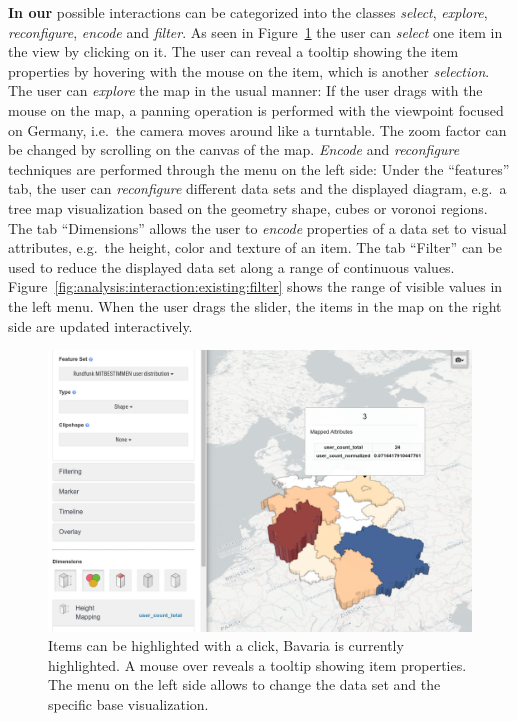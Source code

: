 \textbf{In our \visan{}} possible interactions can be categorized into the classes \emph{select}, \emph{explore}, \emph{reconfigure}, \emph{encode} and \emph{filter}.
As seen in Figure~\ref{fig:analysis:interaction:existing} the user can \emph{select} one item in the view by clicking on it.
The user can reveal a tooltip showing the item properties by hovering with the mouse on the item, which is another \emph{selection}.
The user can \emph{explore} the map in the usual manner:
If the user drags with the mouse on the map, a panning operation is performed with the viewpoint focused on Germany, i.e.\ the camera moves around like a turntable.
The zoom factor can be changed by scrolling on the canvas of the map.
\emph{Encode} and \emph{reconfigure} techniques are performed through the menu on the left side:
Under the ``features'' tab, the user can \emph{reconfigure} different data sets and the displayed diagram, e.g.\ a tree map visualization based on the geometry shape, cubes or voronoi regions.
The tab ``Dimensions'' allows the user to \emph{encode} properties of a data set to visual attributes, e.g.\ the height, color and texture of an item.
The tab ``Filter'' can be used to reduce the displayed data set along a range of continuous values.
Figure~\ref{fig:analysis:interaction:existing:filter} shows the range of visible values in the left menu.
When the user drags the slider, the items in the map on the right side are updated interactively.

\begin{figure}[h]
  \centering
  \includegraphics[width=\textwidth]{images/existing-interactions.png}
  \caption{%
    Items can be highlighted with a click, Bavaria is currently highlighted.
    A mouse over reveals a tooltip showing item properties.
    The menu on the left side allows to change the data set and the specific base visualization.
  }\label{fig:analysis:interaction:existing}
\end{figure}

